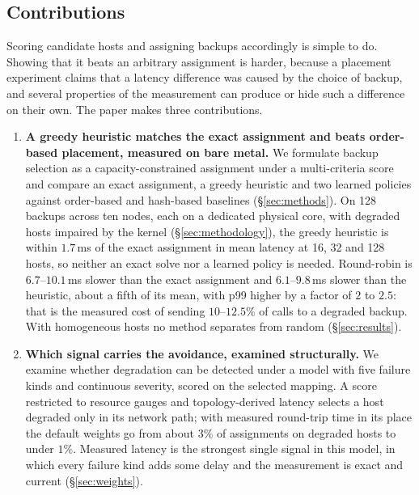 \documentclass[journal]{IEEEtran}
\begin{document}
\subsection{Contributions}

Scoring candidate hosts and assigning backups accordingly is simple to do.
Showing that it beats an arbitrary assignment is harder, because a placement
experiment claims that a latency difference was caused by the choice of backup,
and several properties of the measurement can produce or hide such a difference
on their own. The paper makes three contributions.

\begin{enumerate}
\item \textbf{A greedy heuristic matches the exact assignment and beats
order-based placement, measured on bare metal.} We formulate backup selection
as a capacity-constrained assignment under a multi-criteria score and compare
an exact assignment, a greedy heuristic and two learned policies against
order-based and hash-based baselines (\S\ref{sec:methods}). On 128 backups
across ten nodes, each on a dedicated physical core, with degraded hosts
impaired by the kernel (\S\ref{sec:methodology}), the greedy heuristic is
within $1.7$\,ms of the exact assignment in mean latency at 16, 32 and 128
hosts, so neither an exact solve nor a learned policy is needed. Round-robin
is $6.7$--$10.1$\,ms slower than the exact assignment and $6.1$--$9.8$\,ms
slower than the heuristic, about a fifth of its mean, with p99 higher by a
factor of $2$ to $2.5$: that is the measured cost of sending $10$--$12.5\%$ of
calls to a degraded backup. With homogeneous hosts no method
separates from random (\S\ref{sec:results}).

\item \textbf{Which signal carries the avoidance, examined structurally.} We
examine whether degradation can be detected under a model with five failure
kinds and continuous severity, scored on the selected mapping. A score restricted to resource gauges
and topology-derived latency selects a host degraded only in its network path;
with measured round-trip time in its place the default weights go from about
$3\%$ of assignments on degraded hosts to under $1\%$. Measured latency is the
strongest single signal in this model, in which every failure kind adds some
delay and the measurement is exact and current (\S\ref{sec:weights}).


\end{enumerate}
\end{document}
